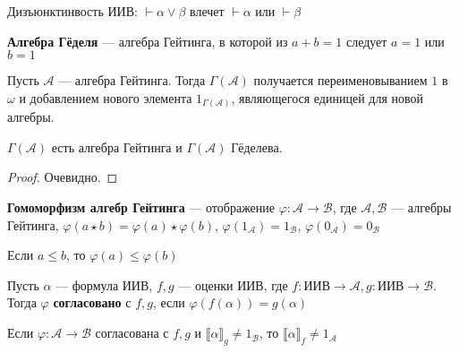 \begin{definition}
    Дизъюнктинвость ИИВ: \(\vdash \alpha \lor \beta\) влечет \(\vdash \alpha\) или \(\vdash \beta\)
\end{definition}

\begin{definition}
    \textbf{Алгебра Гёделя} --- алгебра Гейтинга, в которой из \(a + b = 1\) следует \(a = 1\) или \(b = 1\)
\end{definition}

\begin{definition}
    Пусть \(\mathcal{A}\) --- алгебра Гейтинга. Тогда \(\Gamma(\mathcal{A})\) получается переименовыванием \(1\) в \(\omega\) и добавлением нового элемента \(1_{\Gamma(\mathcal{A})}\), являющегося единицей для новой алгебры.
\end{definition}

\begin{theorem}
    \(\Gamma(\mathcal{A})\) есть алгебра Гейтинга и \(\Gamma(\mathcal{A})\) Гёделева.
\end{theorem}

\begin{proof}
    Очевидно.
\end{proof}

\begin{definition}
    \textbf{Гомоморфизм алгебр Гейтинга} --- отображение \(\varphi : \mathcal{A} \to \mathcal{B}\), где \(\mathcal{A}, \mathcal{B}\) --- алгебры Гейтинга, \(\varphi(a \star b) = \varphi(a) \star \varphi(b)\), \(\varphi(1_{\mathcal{A}}) = 1_{\mathcal{B}}\), \(\varphi(0_{\mathcal{A}}) = 0_{\mathcal{B}}\)
\end{definition}

\begin{theorem}
    Если \(a \leq b\), то \(\varphi(a) \leq \varphi(b)\)
\end{theorem}

\begin{definition}
    Пусть \(\alpha\) --- формула ИИВ, \(f, g\) --- оценки ИИВ, где \(f : \text{ИИВ} \to \mathcal{A}, g : \text{ИИВ} \to \mathcal{B}\). Тогда \(\varphi\) \textbf{согласовано} с \(f, g\), если \(\varphi(f(\alpha)) = g(\alpha)\)
\end{definition}

\begin{theorem}
    Если \(\varphi : \mathcal{A} \to \mathcal{B}\) согласована с \(f, g\) и \(\llbracket \alpha \rrbracket_g \neq 1_{\mathcal{B}}\), то \(\llbracket \alpha \rrbracket_f \neq 1_{\mathcal{A}}\)
\end{theorem}

